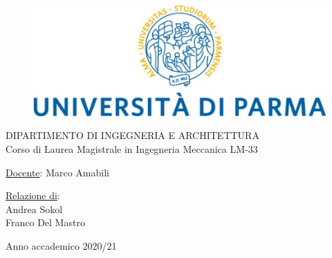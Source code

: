 
\begin{center}
    \begin{figure}[h]
        \centering
        \includegraphics[scale=0.7]{logo.jpg}
      
    \end{figure}
    \vspace{0.5cm}
    \centering
    DIPARTIMENTO DI INGEGNERIA E ARCHITETTURA
\\
\vspace{0.5cm}
\centering
Corso di Laurea Magistrale in Ingegneria Meccanica LM-33\\
\vspace{0.5cm}


\end{center}
\underline{Docente}: Marco Amabili
\begin{flushright}
\underline{Relazione di}: \\
\vspace{0.1cm}
Andrea Sokol\\
Franco Del Mastro
\end{flushright}
\vspace{1cm}
\begin{center}
   Anno accademico 2020/21 
\end{center}

